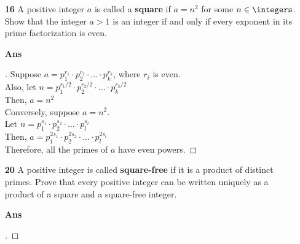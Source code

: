 \documentclass[paper=usletter, fontsize=12pt]{article}
\begin{document}
\begin{itemize}
\begin{itemize}
            \item[\textbf{16}] A positive integer $a$ is called a
            \textbf{square} if $a = n^2$ for some $n \in \integers$. Show that
            the integer $a > 1$ is an integer if and only if every exponent in
            its prime factorization is even.
            \item[\textbf{Ans}]
            \begin{proof}[\unskip\nopunct]
                Suppose $a = p_{1}^{r_{1}} \cdot p_{2}^{r_{2}} \cdot \ldots \cdot p_{k}^{r_{k}}$, where $r_{i}$ is even.\\
                Also, let $n = p_{1}^{r_{1}/2} \cdot p_{2}^{r_{2}/2} \cdot \ldots \cdot p_{k}^{r_{k}/2}$\\
                Then, $a = n^2$\\

                Conversely, suppose $a = n^2$.\\
                Let $n = p_{1}^{s_{1}} \cdot p_{2}^{s_{2}} \cdot \ldots \cdot p_{l}^{s_{l}}$\\
                Then, $a = p_{1}^{2s_{1}} \cdot p_{2}^{2s_{2}} \cdot \ldots \cdot p_{l}^{2s_{l}}$\\
                Therefore, all the primes of $a$ have even powers. \qedhere
            \end{proof}
            \vspace{0.2in}

            \item[\textbf{20}] A positive integer is called \textbf{square-free} if it is a product of distinct primes. Prove that every
            positive integer can be written uniquely as a product of a square
            and a square-free integer.
            \item[\textbf{Ans}]
            \begin{proof}[\unskip\nopunct]
            \end{proof}
            \vspace{0.2in}

        \end{itemize}

    \end{itemize}
\end{document}
